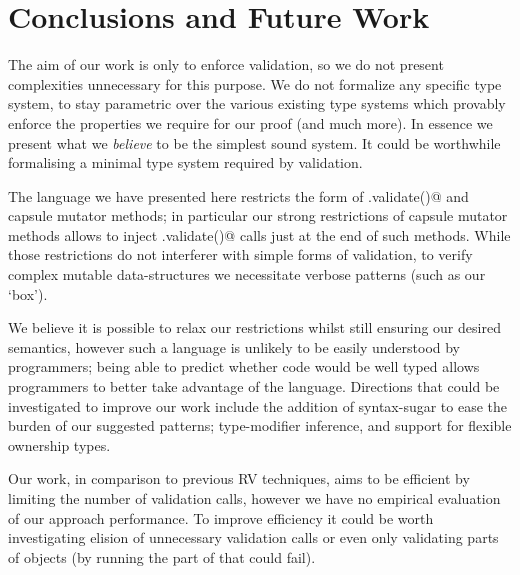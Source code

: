 \section{Conclusions and Future Work}
The aim of our work is only to enforce validation, so we do not present complexities unnecessary for this purpose. We do not formalize any specific type system, to stay parametric over 
the various existing type systems which provably enforce the properties we require for our proof (and much more).
In essence we present what we \emph{believe} to be the simplest sound system.
It could be worthwhile formalising a minimal type system required by validation.






The language we have presented here restricts the form of \Q@.validate()@
and capsule mutator methods; in particular
our strong restrictions of capsule mutator methods
allows to inject \Q@.validate()@ calls just at the end of such methods.
While those restrictions do not interferer with simple
forms of validation, to verify complex mutable data-structures we necessitate verbose patterns (such as our `box').

We believe it is possible to relax our restrictions whilst
still ensuring our desired semantics, however such a language is unlikely to be easily understood by programmers;
being able to predict whether code would be well typed allows programmers
to better take advantage of the language.
Directions that could be investigated to improve our work include the addition of syntax-sugar to ease the burden of our suggested patterns; type-modifier inference, and support for flexible ownership types.

Our work, in comparison to previous RV techniques, aims to be efficient by limiting the number of validation calls, however we have no empirical evaluation of our approach performance.
To improve efficiency it could be worth investigating elision of unnecessary validation calls
or even only validating parts of objects (by running the part of \Q@validate@ that could fail).